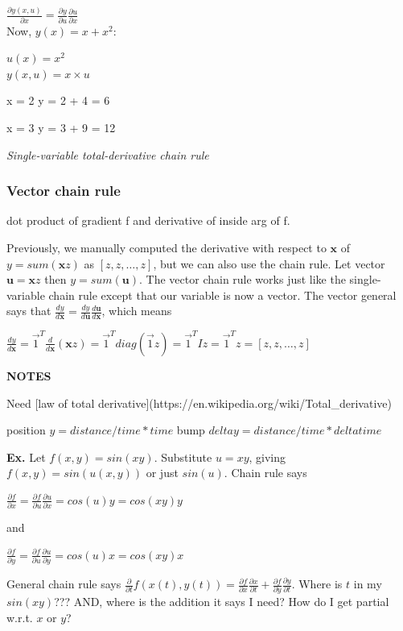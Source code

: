 \documentclass[11pt]{article}
\begin{document}
$\frac{\partial y(x,u)}{\partial x} = \frac{\partial y}{\partial u} \frac{\partial u}{\partial x}$\\

Now, $y(x) = x+x^2$:

$u(x) = x^2$\\
$y(x,u) = x \times u$


x = 2
y = 2 + 4 = 6

x = 3
y = 3 + 9 = 12



{\em Single-variable total-derivative chain rule}



\subsubsection{Vector chain rule}

dot product of gradient f and derivative of inside arg of f. %

Previously, we manually computed the derivative with respect to $\mathbf{x}$ of $y = sum(\mathbf{x}  z)$ as $[z, z, \ldots, z]$, but we can also use the chain rule. Let vector $\mathbf{u} = \mathbf{x}  z$ then $y = sum(\mathbf{u})$. The vector chain rule works just like the single-variable chain rule except that our variable is now a vector.  The vector general says that $\frac{dy}{d\mathbf{x}} = \frac{dy}{d\mathbf{u}}  \frac{d\mathbf{u}}{d\mathbf{x}}$, which means 

$\frac{dy}{d\mathbf{x}} = \vec{1}^T  \frac{d}{d\mathbf{x}} (\mathbf{x}  z) = \vec{1}^T  diag(\vec{1}z) = \vec{1}^T  I  z = \vec{1}^T  z = [z, z, \ldots, z]$

\pagebreak
{\bf NOTES}

Need [law of total derivative](https://en.wikipedia.org/wiki/Total\_derivative)

position $y = distance/time * time$ bump $delta y = distance/time * delta time$

{\bf Ex.} Let $f(x,y) = sin(xy)$. Substitute $u = xy$, giving $f(x,y) = sin(u(x,y))$ or just $sin(u)$. Chain rule says

$\frac{\partial f}{\partial x} = \frac{\partial f}{\partial u}\frac{\partial u}{\partial x} = cos(u)y = cos(xy)y$

and

$\frac{\partial f}{\partial y} = \frac{\partial f}{\partial u}\frac{\partial u}{\partial y} = cos(u)x = cos(xy)x$

General chain rule says $\frac{\partial}{\partial t} f(x(t),y(t)) = \frac{\partial f}{\partial x}\frac{\partial x}{\partial t} + \frac{\partial f}{\partial y}\frac{\partial y}{\partial t}$. Where is $t$ in my $sin(xy)$??? AND, where is the addition it says I need? How do I get partial w.r.t. $x$ or $y$?
\end{document}
